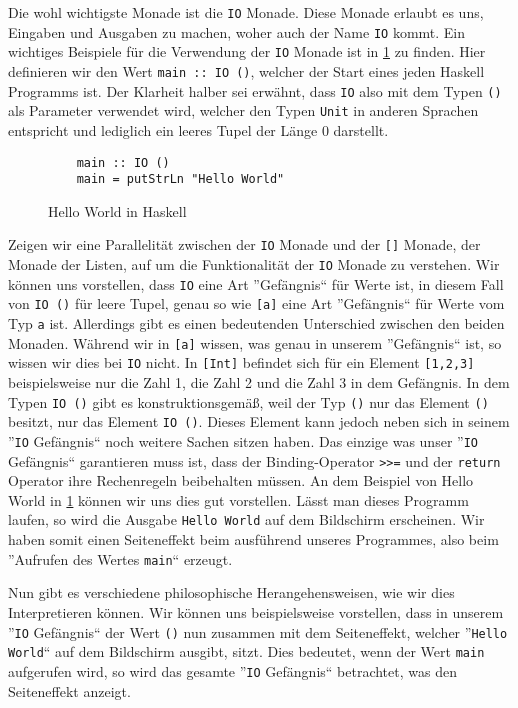 \documentclass{hhuarticle}
\theoremstyle{definition}
\theoremstyle{theorem}
\begin{document}
  Die wohl wichtigste Monade ist die \verb|IO| Monade. Diese Monade
  erlaubt es uns, Eingaben und Ausgaben zu machen, woher auch der
  Name \verb|IO| kommt. Ein wichtiges Beispiele für die Verwendung der
  \verb|IO| Monade ist in \cref{fig:helloworld} zu finden. Hier definieren
  wir den Wert \verb|main :: IO ()|, welcher der Start eines jeden
  Haskell Programms ist. Der Klarheit halber sei erwähnt, dass \verb|IO|
  also mit dem Typen \verb|()| als Parameter verwendet wird, welcher
  den Typen \verb|Unit| in anderen Sprachen entspricht und lediglich
  ein leeres Tupel der Länge 0 darstellt.

  \begin{figure}[h]
    \begin{lstlisting}
    main :: IO ()
    main = putStrLn "Hello World"
    \end{lstlisting}
    \caption{Hello World in Haskell}%
    \label{fig:helloworld}
  \end{figure}

  Zeigen wir eine Parallelität zwischen der \verb|IO| Monade und der
  \verb|[]| Monade, der Monade der Listen, auf um die Funktionalität
  der \verb|IO| Monade zu verstehen. Wir können uns vorstellen, dass
  \verb|IO| eine Art ''Gefängnis`` für Werte ist, in diesem Fall 
  von \verb|IO ()| für leere Tupel, genau so wie \verb|[a]| eine Art
  ''Gefängnis`` für Werte vom Typ \verb|a| ist. Allerdings gibt es einen
  bedeutenden Unterschied zwischen den beiden Monaden. Während wir
  in \verb|[a]| wissen, was genau in unserem ''Gefängnis`` ist, so
  wissen wir dies bei \verb|IO| nicht. In \verb|[Int]| befindet sich
  für ein Element \verb|[1,2,3]| beispielsweise nur die Zahl 1, die Zahl
  2 und die Zahl 3 in dem Gefängnis. In dem Typen \verb|IO ()|
  gibt es konstruktionsgemäß, weil der Typ \verb|()| nur das Element \verb|()|
  besitzt, nur das Element \verb|IO ()|. Dieses Element kann jedoch
  neben sich in seinem ''\verb|IO| Gefängnis`` noch weitere Sachen sitzen haben.
  Das einzige was unser ''\verb|IO| Gefängnis`` garantieren muss ist, dass
  der Binding-Operator \verb|>>=| und der \verb|return| Operator
  ihre Rechenregeln beibehalten müssen. An dem Beispiel von Hello World
  in \cref{fig:helloworld} können wir uns dies gut vorstellen. Lässt man
  dieses Programm laufen, so wird die Ausgabe \verb|Hello World| auf
  dem Bildschirm erscheinen. Wir haben somit einen Seiteneffekt beim
  ausführend unseres Programmes, also beim ''Aufrufen des Wertes \verb|main|`` erzeugt.

  Nun gibt es verschiedene philosophische Herangehensweisen, wie wir
  dies Interpretieren können. Wir können uns beispielsweise vorstellen,
  dass in unserem ''\verb|IO| Gefängnis`` der Wert \verb|()| nun zusammen mit
  dem Seiteneffekt, welcher ''\verb|Hello World|`` auf dem
  Bildschirm ausgibt, sitzt.
  Dies bedeutet, wenn der Wert \verb|main| aufgerufen wird, so wird
  das gesamte ''\verb|IO| Gefängnis`` betrachtet, was den Seiteneffekt
  anzeigt.
\end{document}

